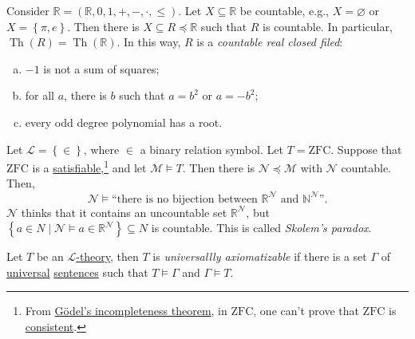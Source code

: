 \begin{eg}
	Consider \(\mathbb{R} =(\mathbb{R} , 0, 1, +, -, \cdot, \leq )\). Let \(X \subseteq \mathbb{R} \) be countable, e.g., \(X = \varnothing \) or \(X = \left\{ \pi , e \right\} \). Then there is \(X \subseteq R \preceq \mathbb{R} \) such that \(R\) is countable. In particular, \(\mathop{\mathrm{Th}}(R) = \mathop{\mathrm{Th}}(\mathbb{R})\). In this way, \(R\) is a \emph{countable real closed filed}:
	\begin{enumerate}[(a)]
		\item \(-1\) is not a sum of squares;
		\item for all \(a\), there is \(b\) such that \(a = b^2\) or \(a=-b^2\);
		\item every odd degree polynomial has a root.
	\end{enumerate}
\end{eg}

\begin{eg}
	Let \(\mathcal{L} = \left\{ \in\right\} \), where \(\in\) a binary relation symbol. Let \(T=\mathrm{ZFC} \). Suppose that \(\mathrm{ZFC} \) is a \hyperref[def:satisfiable]{satisfiable},\footnote{From \href{https://en.wikipedia.org/wiki/Gödel's_incompleteness_theorems}{Gödel's incompleteness theorem}, in \(\mathrm{ZFC} \), one can't prove that \(\mathrm{ZFC} \) is \hyperref[def:consistent]{consistent}.} and let \(\mathcal{M} \models T\). Then there is \(\mathcal{N} \preceq \mathcal{M} \) with \(\mathcal{N} \) countable. Then,
	\[
		\mathcal{N} \models \text{``there is no bijection between \(\mathbb{R} ^\mathcal{N} \) and \(\mathbb{N} ^\mathcal{N} \)''}.
	\]
	\(\mathcal{N} \) thinks that it contains an uncountable set \(\mathbb{R} ^\mathcal{N} \), but \(\left\{ a\in N \mid \mathcal{N} \models a\in \mathbb{R} ^\mathcal{N} \right\} \subseteq N\) is countable. This is called \emph{Skolem's paradox}.
\end{eg}

\begin{definition}\label{def:universallly-axiomatizable}
	Let \(T\) be an \hyperref[def:theory]{\(\mathcal{L} \)-theory}, then \(T\) is \emph{universallly axiomatizable} if there is a set \(\Gamma \) of \hyperref[not:universal]{universal} \hyperref[def:sentence]{sentences} such that \(T \models \Gamma \) and \(\Gamma \models T\).
\end{definition}

